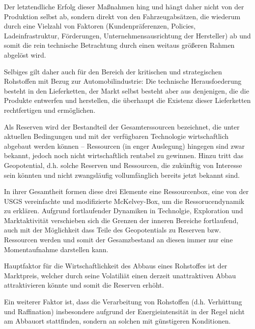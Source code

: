 \documentclass[12pt,a4paper,oneside]{book} %
\begin{document}
	Der letztendliche Erfolg dieser Maßnahmen hing und hängt daher nicht von der Produktion selbst ab, sondern direkt von den Fahrzeugabsätzen, die wiederum durch eine Vielzahl von Faktoren (Kundenpräferenzen, Policies, Ladeinfrastruktur, Förderungen, Unternehmensausrichtung der Hersteller) ab und somit die rein technische Betrachtung durch einen weitaus größeren Rahmen abgelöst wird.
	
	Selbiges gilt daher auch für den Bereich der kritischen und strategischen Rohstoffen mit Bezug zur Automobilindustrie: Die technische Herausfoederung besteht in den Lieferketten, der Markt selbst besteht aber aus denjenigen, die die Produkte entwerfen und herstellen, die überhaupt die Existenz dieser Lieferketten rechtfertigen und ermöglichen.
	
	Als Reserven wird der Bestandteil der Gesamterssourcen bezeichnet, die unter aktuellen Bedingungen und mit der verfügbaren Technologie wirtschaftlich abgebaut werden können --  Ressourcen (in enger Auslegung) hingegen sind zwar bekannt, jedoch noch nicht wirtschaftlich rentabel zu gewinnen.\autocite{Wellmer, The Right to Know the Geopotential of Minerals for Ensuring Food Supply Security} Hinzu tritt das Geopotential, d.h. solche Reserven und Ressourcen, die zukünftig von Interesse sein könnten und nicht zwangsläufig vollumfänglich bereits jetzt bekannt sind.\autocite{Wellmer,}
	
	In ihrer Gesamtheit formen diese drei Elemente eine \glqq Ressourcenbox\grqq, eine von der USGS vereinfachte und modifizierte McKelvey-Box, um die Ressorucendynamik zu erklären. Aufgrund fortlaufender Dynamiken in Technolgie, Exploration und Marktaktivität verschieben sich die Grenzen der inneren Bereiche fortlaufend, auch mit der Möglichkeit dass Teile des Geopotentials zu Reserven bzw. Ressourcen werden und somit der Gesamzbestand an diesen immer nur eine Momentaufnahme darstellen kann.\autocite{Wellmer 2015}
	
	
	Hauptfaktor für die Wirtschaftlichkeit des Abbaus eines Rohstoffes ist der Marktpreis, welcher durch seine Volatiliät einen derzeit unattraktiven Abbau attraktivieren könnte und somit die Reserven erhöht.\autocite{Frenz 2025, S. 83}
	
	Ein weiterer Faktor ist, dass die Verarbeitung von Rohstoffen (d.h. Verhüttung und Raffination) insbesondere aufgrund der Energieintensität in der Regel nicht am Abbauort stattfinden, sondern an solchen mit günstigeren Konditionen.
	
\end{document}
